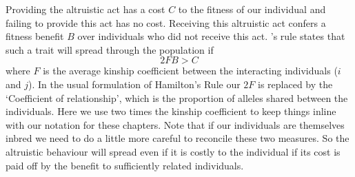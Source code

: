 Providing the altruistic act has a cost $C$ to the fitness of our individual and failing to provide this act has no cost. Receiving this altruistic act confers a fitness benefit $B$ over individuals who did not receive this act. \citeauthor{hamilton1964genetical}'s rule states that such a trait will spread through the population if 
\begin{equation}
 2F B > C 
\end{equation}
where $F$ is the average kinship coefficient between the interacting
individuals ($i$ and $j$). In the usual formulation of Hamilton's Rule our $2F$ is replaced by the `Coefficient of relationship', which is the
  proportion of alleles shared between the individuals. Here we use
  two times the kinship coefficient to keep things inline with our 
  notation for these chapters. Note that if our individuals are themselves inbred we need
to do a little more careful to reconcile these two measures.
So the altruistic behaviour will spread even if it is costly to the individual if its cost is paid off by the benefit to sufficiently related individuals. 

